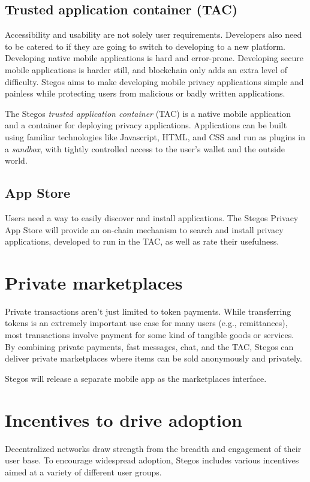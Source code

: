 \documentclass[8pt,fleqn,openany]{book}
\begin{document}
	\subsection{Trusted application container (TAC)}
	Accessibility and usability are not solely user requirements. Developers also need to be catered to if they are going to switch to developing to a new platform. Developing native mobile applications is hard and error-prone. Developing secure mobile applications is harder still, and blockchain only adds an extra level of difficulty. Stegos aims to make developing mobile privacy applications simple and painless while protecting users from malicious or badly written applications. 
	
	The Stegos \textit{trusted application container} (TAC) is a native mobile application and a container for deploying privacy applications. Applications can be built using familiar technologies like Javascript, HTML, and CSS and run as plugins in a \textit{sandbox}, with tightly controlled access to the user’s wallet and the outside world.
	
	\subsection{App Store}
	Users need a way to easily discover and install applications. The Stegos Privacy App Store will provide an on-chain mechanism to search and install privacy applications, developed to run in the TAC, as well as rate their usefulness.  
	
	\section{Private marketplaces}
	Private transactions aren't just limited to token payments. While transferring tokens is an extremely important use case for many users (e.g., remittances), most transactions involve payment for some kind of tangible goods or services. By combining private payments, fast messages, chat, and the TAC, Stegos can deliver private marketplaces where items can be sold anonymously and privately. 
	
	Stegos will release a separate mobile app as the marketplaces interface.  
	
	\section{Incentives to drive adoption}
	Decentralized networks draw strength from the breadth and engagement of their user base. To encourage widespread adoption, Stegos includes various incentives aimed at a variety of different user groups. 
	
\end{document}
